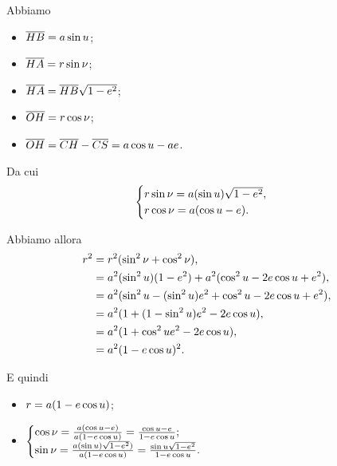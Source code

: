 \Proof Abbiamo
\begin{itemize}
	\item $\overline{HB} = a \sin{u}$;
	\item $\overline{HA} = r \sin{\nu}$;
	\item $\overline{HA} = \overline{HB} \sqrt{1 - e^2}$;
	\item $\overline{OH} = r \cos{\nu}$;
	\item $\overline{OH}
          = \overline{CH} - \overline{CS}
          = a \cos{u}
            - a e$.
\end{itemize}
Da cui
\[
\begin{cases}
	r \sin{\nu}
    = a(\sin{u})\sqrt{1 - e^2},\\
	r \cos{\nu}
    = a (\cos{u} - e).
\end{cases}
\]
\par Abbiamo allora
\begin{align*}
	r^2
	&= r^2(\sin^2{\nu} + \cos^2{\nu}),\\
	&= a^2 (\sin^2{u}) (1 - e^2)
    + a^2 (\cos^2{u}
    - 2 e \cos{u} + e^2),\\
	&= a^2 (\sin^2{u}
    - (\sin^2{u})e^2
    + \cos^2{u} - 2 e \cos{u}
    + e^2),\\
	&= a^2 (1 + (1 - \sin^2{u})e^2
    - 2 e \cos{u}),\\
	&= a^2 (1 + \cos^2{u}e^2
    - 2 e \cos{u}),\\
	&= a^2 (1 - e \cos{u})^2.
\end{align*}
\par E quindi
\begin{itemize}
	\item $r = a (1 - e \cos{u})$;
	\item
	$
		\begin{cases}
			\cos{\nu}
        = \frac{a(\cos{u} - e)}
          {a (1 - e \cos{u})}
        =  \frac{\cos{u} - e}
          {1 - e \cos{u}};\\
			\sin{\nu}
        = \frac{a (\sin{u})
            \sqrt{1 - e^2})}
          {a(1 - e \cos{u})}
        = \frac{\sin{u}\sqrt{1 - e^2}}
          {1 - e \cos{u}}. 
		\end{cases}
	$
\end{itemize}
